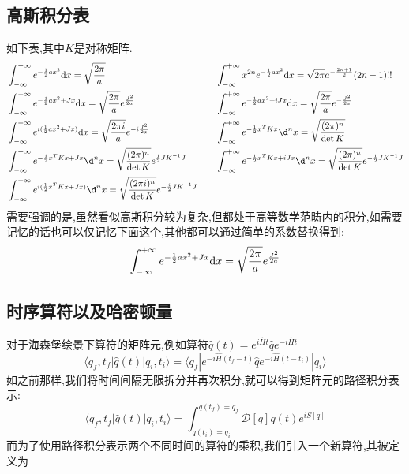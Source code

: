 \subsection*{高斯积分表}
如下表,其中$ K $是对称矩阵.
\begin{equation}\label{GaussIntegral}
	\begin{aligned}{2}
		&\int_{-\infty}^{+\infty} e^{-\frac{1}{2}ax^{2}}\dx=\sqrt{\frac{2\pi}{a}} &\quad
		&\int_{-\infty}^{+\infty}x^{2n}e^{-\frac12ax^2}\dx=\sqrt{2\pi}a^{-\frac{2n+1}2}(2n-1)!! \\
		&\int_{-\infty}^{+\infty}e^{-\frac12ax^2+Jx}\dx=\sqrt{\frac{2\pi}a}e^{\frac{J^2}{2a}} &
		&\int_{-\infty}^{+\infty} e^{-\frac{1}{2} ax^{2}+iJx} \dx=\sqrt{\frac{2\pi}{a}}e^{-\frac{J^{2}}{2a}} \\
		&\int_{-\infty}^{+\infty}e^{i(\frac{1}{2}ax^{2}+Jx)}\dx=\sqrt{\frac{2\pi i}{a}}e^{-i\frac{J^{2}}{2a}} &
		&\int_{-\infty}^{+\infty}e^{-\frac{1}{2}x^{T}Kx}\d^{n}x=\sqrt{\frac{(2\pi)^{n}}{\det K}} \\
		&\int_{-\infty}^{+\infty}e^{-\frac{1}{2}x^{T}Kx+Jx}\d^{n}x=\sqrt{\frac{(2\pi)^{n}}{\det K}}e^{\frac{1}{2}JK^{-1}J} &
		&\int_{-\infty}^{+\infty}e^{-\frac{1}{2}x^{T}Kx+iJx}\d^{n}x=\sqrt{\frac{(2\pi)^{n}}{\det K}}e^{-\frac{1}{2}JK^{-1}J} \\
		&\int_{-\infty}^{+\infty}e^{i(\frac{1}{2}x^{T}Kx+Jx)}\d^{n}x=\sqrt{\frac{(2\pi i)^{n}}{\det K}}e^{-\frac{i}{2}JK^{-1}J}
	\end{aligned}
\end{equation}
需要强调的是,虽然看似高斯积分较为复杂,但都处于高等数学范畴内的积分,如需要记忆的话也可以仅记忆下面这个,其他都可以通过简单的系数替换得到:
\begin{equation}
	\int_{-\infty}^{+\infty}e^{-\frac12ax^2+Jx}\mathrm{d}x=\sqrt{\frac{2\pi}a}e^{\frac{J^2}{2a}}
\end{equation}
\subsection*{时序算符以及哈密顿量}
对于海森堡绘景下算符的矩阵元,例如算符$\hat{q}(t)=e^{i\hat{H}t}\hat{q}e^{-i\hat{H}t}$
\begin{equation}
	\langle q_f,t_f|\hat{q}(t)|q_i,t_i\rangle=\langle q_f|e^{-i\hat{H}(t_f-t)}\hat{q}e^{-i\hat{H}(t-t_i)}|q_i\rangle 
\end{equation}
如之前那样,我们将时间间隔无限拆分并再次积分,就可以得到矩阵元的路径积分表示:
\begin{equation}
	\langle q_f,t_f|\hat{q}(t)|q_i,t_i\rangle=\int_{q(t_i)=q_i}^{q(t_f)=q_f}\mathcal{D}[q] q(t)e^{iS[q]}
\end{equation}
而为了使用路径积分表示两个不同时间的算符的乘积,我们引入一个新算符,其被定义为\\

